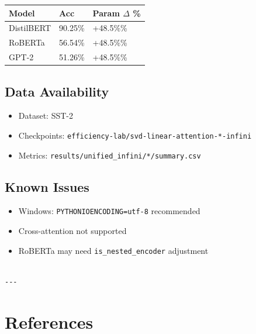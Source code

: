 \begin{table}[H]
\centering
\small
\begin{tabular}{lll}
\toprule
\textbf{Model} & \textbf{Acc} & \textbf{Param $\Delta$ \%} \\
\midrule
DistilBERT & 90.25\% & +48.5\%\% \\
RoBERTa & 56.54\% & +48.5\%\% \\
GPT-2 & 51.26\% & +48.5\%\% \\
\bottomrule
\end{tabular}
\end{table}

\subsection{Data Availability}

\begin{itemize}
\item Dataset: SST-2
\item Checkpoints: \texttt{efficiency-lab/svd-linear-attention-*-infini}
\item Metrics: \texttt{results/unified\_infini/*/summary.csv}

\end{itemize}
\subsection{Known Issues}

\begin{itemize}
\item Windows: \texttt{PYTHONIOENCODING=utf-8} recommended
\item Cross-attention not supported
\item RoBERTa may need \texttt{is\_nested\_encoder} adjustment
\end{itemize}
\begin{lstlisting}

---
\end{lstlisting}


\section{References}

